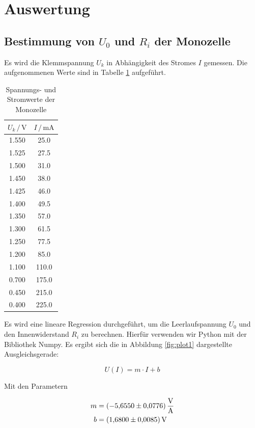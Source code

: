 \section{Auswertung}
\label{sec:Auswertung}

\subsection{Bestimmung von $U_0$ und $R_i$ der Monozelle}

Es wird die Klemmspannung $U_k$ in Abhängigkeit des Stromes $I$ gemessen. 
Die aufgenommenen Werte sind in Tabelle \ref{tab:Monozelle} aufgeführt. 

\begin{table}
\centering
\caption{Spannungs- und Stromwerte der Monozelle}
\label{tab:Monozelle}
\begin{tabular}{c c}
\toprule
$U_k \,/\, \si{\volt}$ & $I \,/\, \si{\milli\ampere}$\\
\midrule
1.550 &  25.0\\
1.525 &  27.5\\
1.500 &  31.0\\
1.450 &  38.0\\
1.425 &  46.0\\
1.400 &  49.5\\
1.350 &  57.0\\
1.300 &  61.5\\
1.250 &  77.5\\
1.200 &  85.0\\
1.100 & 110.0\\
0.700 & 175.0\\
0.450 & 215.0\\
0.400 & 225.0\\
\bottomrule
\end{tabular}
\end{table}

Es wird eine lineare Regression durchgeführt, um die Leerlaufspannung $U_0$ 
und den Innenwiderstand $R_i$ zu berechnen. Hierfür verwenden wir Python mit 
der Bibliothek Numpy.
Es ergibt sich die in Abbildung \ref{fig:plot1} dargestellte Ausgleichsgerade:

\begin{equation}
U(I) = m\cdot I + b 
\label{eqn:Gerade}
\end{equation}

Mit den Parametern

\begin{align*}
m &= \SI{-5.655+-0.0776}{\volt\per\ampere}\\
b &= \SI{1.680+-0.0085}{\volt}
\end{align*}

